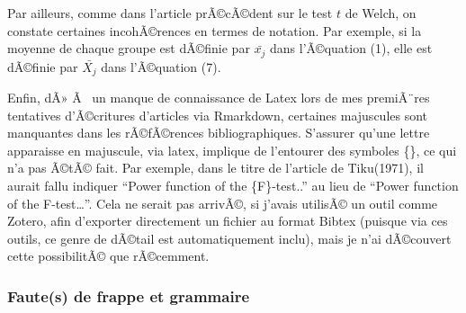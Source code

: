 \begin{appendix}
Par ailleurs, comme dans l'article prÃ©cÃ©dent sur le test \(t\) de
Welch, on constate certaines incohÃ©rences en termes de notation. Par
exemple, si la moyenne de chaque groupe est dÃ©finie par \(\bar{x_j}\)
dans l'Ã©quation (1), elle est dÃ©finie par \(\bar{X_j}\) dans
l'Ã©quation (7).

Enfin, dÃ» Ã~ un manque de connaissance de Latex lors de mes premiÃ¨res
tentatives d'Ã©critures d'articles via Rmarkdown, certaines majuscules
sont manquantes dans les rÃ©fÃ©rences bibliographiques. S'assurer qu'une
lettre apparaisse en majuscule, via latex, implique de l'entourer des
symboles \{\}, ce qui n'a pas Ã©tÃ© fait. Par exemple, dans le titre de
l'article de Tiku(1971), il aurait fallu indiquer ``Power function of
the \{F\}-test..'' au lieu de ``Power function of the F-test\ldots{}''.
Cela ne serait pas arrivÃ©, si j'avais utilisÃ© un outil comme Zotero,
afin d'exporter directement un fichier au format Bibtex (puisque via ces
outils, ce genre de dÃ©tail est automatiquement inclu), mais je n'ai
dÃ©couvert cette possibilitÃ© que rÃ©cemment.

\hypertarget{fautes-de-frappe-et-grammaire}{%
\subsubsection{Faute(s) de frappe et
grammaire}\label{fautes-de-frappe-et-grammaire}}


\end{appendix}
